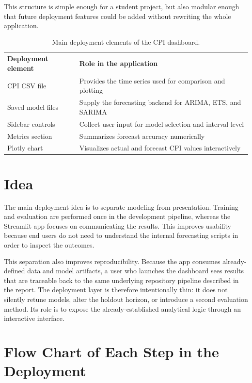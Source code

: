 This structure is simple enough for a student project, but also modular enough that future deployment features could be added without rewriting the whole application.

\begin{table}[htbp]
    \centering
    \caption{Main deployment elements of the CPI dashboard.}
    \label{tab:app-deployment-elements}
    \begin{tabular}{p{4cm}p{8.5cm}}
        \hline
        Deployment element & Role in the application \\
        \hline
        CPI CSV file & Provides the time series used for comparison and plotting \\
        Saved model files & Supply the forecasting backend for ARIMA, ETS, and SARIMA \\
        Sidebar controls & Collect user input for model selection and interval level \\
        Metrics section & Summarizes forecast accuracy numerically \\
        Plotly chart & Visualizes actual and forecast CPI values interactively \\
        \hline
    \end{tabular}
\end{table}

\section{Idea}

The main deployment idea is to separate modeling from presentation. Training and evaluation are performed once in the development pipeline, whereas the Streamlit app focuses on communicating the results. This improves usability because end users do not need to understand the internal forecasting scripts in order to inspect the outcomes.

This separation also improves reproducibility. Because the app consumes already-defined data and model artifacts, a user who launches the dashboard sees results that are traceable back to the same underlying repository pipeline described in the report. The deployment layer is therefore intentionally thin: it does not silently retune models, alter the holdout horizon, or introduce a second evaluation method. Its role is to expose the already-established analytical logic through an interactive interface.

\section{Flow Chart of Each Step in the Deployment}

